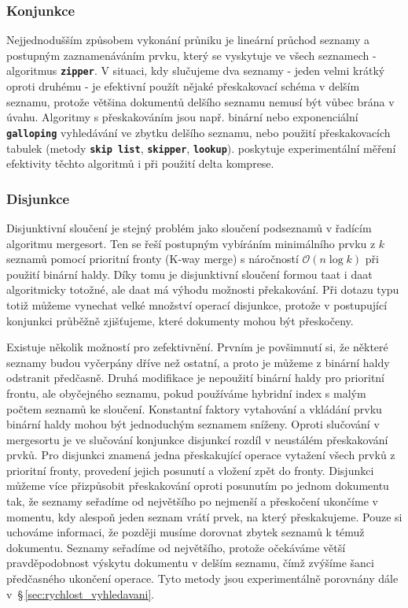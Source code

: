\documentclass[11pt,letterpaper,oneside,openright]{book}
\newcommand{\bftt}[1]{\texttt{\textbf{#1}}}
\begin{document}
\subsubsection{Konjunkce}
Nejjednodušším způsobem vykonání průniku je lineární průchod seznamy a
postupným zaznamenáváním prvku, který se vyskytuje ve všech seznamech -
algoritmus \bftt{zipper}. V situaci, kdy slučujeme dva seznamy - jeden velmi
krátký oproti druhému - je efektivní použít nějaké přeskakovací schéma v delším
seznamu, protože většina dokumentů delšího seznamu nemusí být vůbec brána v
úvahu. Algoritmy s přeskakováním jsou např. binární nebo exponenciální
\bftt{galloping} vyhledávání ve zbytku delšího seznamu, nebo použití
přeskakovacích tabulek (metody \bftt{skip list}, \bftt{skipper},
\bftt{lookup}).  \cite{Sanders:2007:III:2791188.2791195} poskytuje
experimentální měření efektivity těchto algoritmů i při použití delta komprese.

\subsubsection{Disjunkce} \label{sec:disjunctive_merge}
Disjunktivní sloučení je stejný problém jako sloučení podseznamů v řadícím
algoritmu mergesort. Ten se řeší postupným vybíráním minimálního prvku z $k$
seznamů pomocí prioritní fronty (K-way merge) s náročností $\mathcal{O}(n \log
k)$ při použití binární haldy. Díky tomu je disjunktivní sloučení formou taat i
daat algoritmicky totožné, ale daat má výhodu možnosti překakování. Při dotazu
typu  totiž můžeme vynechat velké množství operací
disjunkce, protože v postupující konjunkci průběžně zjišťujeme, které dokumenty
mohou být přeskočeny.

Existuje několik možností pro zefektivnění. Prvním je povšimnutí si, že některé
seznamy budou vyčerpány dříve než ostatní, a proto je můžeme z binární haldy
odstranit předčasně. Druhá modifikace je nepoužití binární haldy pro prioritní
frontu, ale obyčejného seznamu, pokud používáme hybridní index s malým počtem
seznamů ke sloučení. Konstantní faktory vytahování a vkládání prvku binární
haldy mohou být jednoduchým seznamem sníženy. Oproti slučování v mergesortu je
ve slučování konjunkce disjunkcí rozdíl v neustálém přeskakování prvků. Pro
disjunkci znamená jedna přeskakující operace vytažení všech prvků z prioritní
fronty, provedení jejich posunutí a vložení zpět do fronty. Disjunkci můžeme
více přizpůsobit přeskakování oproti posunutím po jednom dokumentu tak, že
seznamy seřadíme od největšího po nejmenší a přeskočení ukončíme v momentu, kdy
alespoň jeden seznam vrátí prvek, na který přeskakujeme. Pouze si uchováme
informaci, že později musíme dorovnat zbytek seznamů k témuž dokumentu. Seznamy
seřadíme od největšího, protože očekáváme větší pravděpodobnost výskytu
dokumentu v delším seznamu, čímž zvýšíme šanci předčasného ukončení operace.
Tyto metody jsou experimentálně porovnány dále
v~\S\,\ref{sec:rychlost_vyhledavani}.
\end{document}

